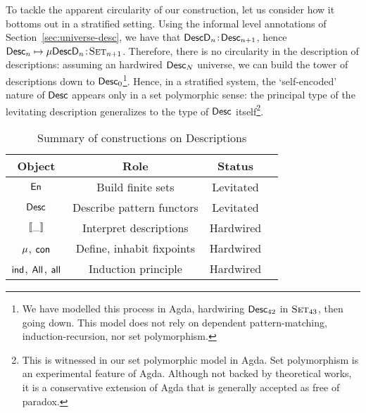 
To tackle the apparent circularity of our construction, let us
consider how it bottoms out in a stratified setting. Using the
informal level annotations of Section~\ref{sec:universe-desc}, we have
that \(\Bhab{\DescD_n}{\Desc_{n+1}}\), hence \(\Bhab{\Desc_n \mapsto
  \Mu{\DescD_n}}{\Set_{n+1}}\). Therefore, there is no circularity in
the description of descriptions: assuming an hardwired $\Desc_N$
universe, we can build the tower of descriptions down to
$\Desc_0$\footnote{We have modelled this process in Agda, hardwiring
  $\Desc_{42}$ in $\Set_{43}$, then going down. This model does not
  rely on dependent pattern-matching, induction-recursion, nor set
  polymorphism.}. Hence, in a stratified system, the `self-encoded'
nature of $\Desc$ appears only in a set polymorphic sense: the
principal type of the levitating description generalizes to the type
of $\Desc$ itself\footnote{This is witnessed in our set polymorphic
  model in Agda. Set polymorphism is an experimental feature of
  Agda. Although not backed by theoretical works, it is a conservative
  extension of Agda that is generally accepted as free of paradox.}.

\begin{table}

{\small

\begin{center}
\begin{tabular}{|c|c|c|c|}
\hline
Object                & Role                        & Status \\
\hline
\hline
$\EnumU$              & Build finite sets           & Levitated \\
\hline
$\Desc$               & Describe pattern functors   & Levitated \\
\hline
$\SYMBdescop{\_}$     & Interpret descriptions      & Hardwired \\
\hline
$\SYMBMu$, $\SYMBCon$ & Define, inhabit fixpoints   & Hardwired \\
\hline
$\SYMBind$, $\SYMBAll$, $\SYMBall$  
                      & Induction principle         & Hardwired \\
\hline
\end{tabular}
\end{center}
}

\caption{Summary of constructions on Descriptions}
\label{tab:sumup-operators}

\end{table}

